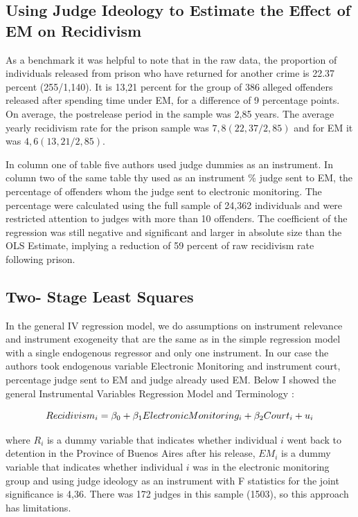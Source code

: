 \documentclass[a4paper,12pt]{article}
\begin{document}
\subsection{Using Judge Ideology to Estimate the Effect of EM on Recidivism}
As a benchmark it was helpful to note that in the raw data, the proportion of individuals released from prison who have returned for another crime is 22.37 percent (255/1,140). It is 13,21 percent for the group of 386 alleged offenders released after spending time under EM, for a difference of 9 percentage points. On average, the postrelease period in the sample was 2,85 years. The average yearly recidivism rate for the prison sample was $7,8 (22,37/2,85)$ and for EM it was $4,6 (13,21/2,85)$. 

In column one of table five authors used judge dummies as an instrument. In column two of the same table thy used as an instrument \% judge sent to EM, the percentage of offenders whom the judge sent to electronic monitoring. The percentage were calculated using the full sample of 24,362 individuals and were restricted attention to judges with more than 10 offenders. The coefficient of the regression was still negative and significant and larger in absolute size than the OLS Estimate, implying a reduction of 59 percent of raw recidivism rate following prison. 

\subsection{Two- Stage Least Squares}

In the general IV regression model, we do assumptions  on instrument relevance and instrument exogeneity that are the same as in the simple regression model with a single endogenous regressor and only one instrument. In our case the authors took endogenous variable Electronic Monitoring and instrument court, percentage judge sent to EM and judge already used EM. Below I showed the general Instrumental Variables Regression Model and Terminology : 

\begin{equation}
    \centering
    Recidivism_i = \beta_0 + \beta_1Electronic Monitoring_i + \beta_2Court_i + u_i  
\end{equation}

where $R_i$ is a dummy variable that indicates whether individual $i$ went back to detention in the Province of Buenos Aires after his release, $EM_i$ is a dummy variable that indicates whether individual $i$ was in the electronic monitoring group and using judge ideology as an instrument with F statistics for the joint significance is 4,36. There was 172 judges in this sample (1503), so this approach has limitations. 
\end{document}
